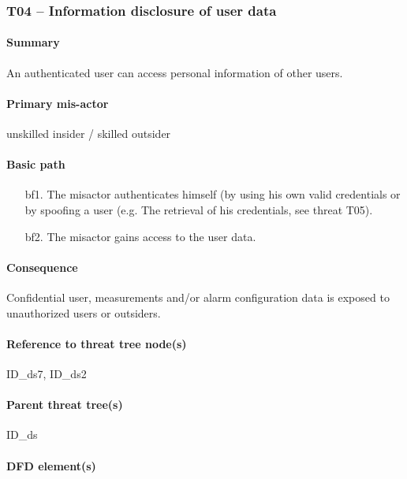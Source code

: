\subsubsection{T04 -- Information disclosure of user data}

\paragraph{Summary}

\npar An authenticated user can access personal information of other users.

\paragraph{Primary mis-actor}

\npar unskilled insider / skilled outsider

\paragraph{Basic path}

\begin{enumerate}
	\item[bf1.] The misactor authenticates himself (by using his own valid
	credentials or by spoofing a user (e.g. The retrieval of his credentials, see
	threat T05).
    \item[bf2.] The misactor gains access to the user data.
\end{enumerate}

\paragraph{Consequence}

\npar Confidential user, measurements and/or alarm configuration data is exposed
to unauthorized users or outsiders.

\paragraph{Reference to threat tree node(s)}

ID\_ds7, ID\_ds2

\paragraph{Parent threat tree(s)}

ID\_ds

\paragraph{DFD element(s)}

